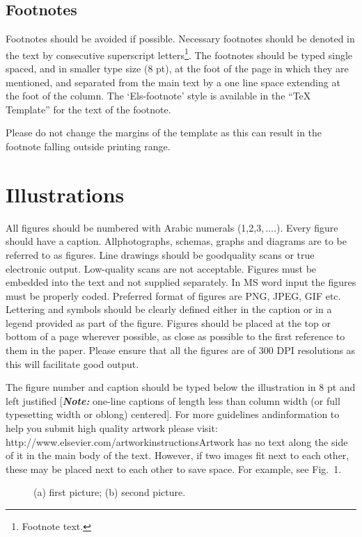 \documentclass[3p,times,procedia]{elsarticle}
\begin{document}
\subsection{Footnotes}
Footnotes should be avoided if possible. Necessary footnotes should be denoted in the text by consecutive superscript letters\footnote{Footnote text.}. The footnotes should be typed single spaced, and in smaller type size (8 pt), at the foot of the page in which they are mentioned, and separated from the main text by a one line space extending at the foot of the column. The `Els-footnote' style is available in the ``TeX Template'' for the text of the footnote.

Please do not change the margins of the template as this can result in the footnote falling outside printing range.


\section{Illustrations}
All figures should be numbered with Arabic numerals (1,2,3,$\,\ldots.$). Every figure should have a caption. All\break photographs, schemas, graphs and diagrams are to be referred to as figures. Line drawings should be good\break quality scans or true electronic output. Low-quality scans are not acceptable. Figures must be embedded into the text and not supplied separately. In MS word input the figures must be properly coded. Preferred format of figures are PNG, JPEG, GIF etc. Lettering and symbols should be clearly defined either in the caption or in a legend provided as part of the figure. Figures should be placed at the top or bottom of a page wherever possible, as close as possible to the first reference to them in the paper. Please ensure that all the figures are of 300 DPI resolutions as this will facilitate good output.

The figure number and caption should be typed below the illustration in 8 pt and left justified [{\bfseries\itshape Note:} one-line captions of length less than column width (or full typesetting width or oblong) centered]. For more guidelines and\break information to help you submit high quality artwork please visit: http://www.elsevier.com/artworkinstructions\break Artwork has no text along the side of it in the main body of the text. However, if two images fit next to each other, these may be placed next to each other to save space. For example, see Fig.~1.
\begin{figure}[t]\vspace*{4pt}
\caption{(a) first picture; (b) second picture.}
\end{figure}
\end{document}

